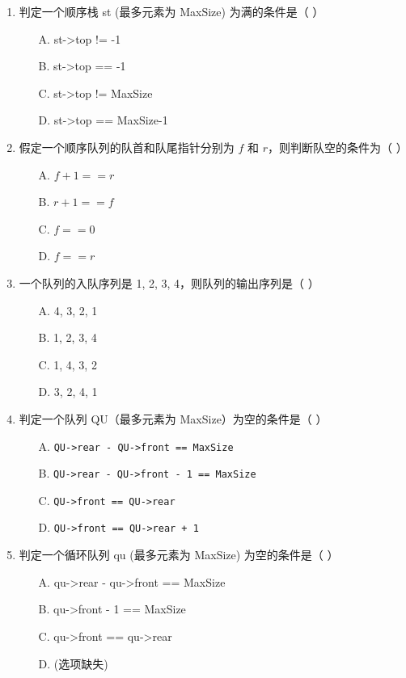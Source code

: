\documentclass[12pt, a4paper]{article}
\begin{document}
\begin{enumerate}[label=\arabic*.]
	\item 判定一个顺序栈 st (最多元素为 MaxSize) 为满的条件是（ ）
	      \begin{enumerate}
		      \item[A.] st->top != -1
		      \item[B.] st->top == -1
		      \item[C.] st->top != MaxSize
		      \item[D.] st->top == MaxSize-1
	      \end{enumerate}

	\item 假定一个顺序队列的队首和队尾指针分别为 $f$ 和 $r$，则判断队空的条件为（ ）
	      \begin{enumerate}
		      \item[A.] $f+1==r$
		      \item[B.] $r+1==f$
		      \item[C.] $f==0$
		      \item[D.] $f==r$
	      \end{enumerate}

	\item 一个队列的入队序列是 1, 2, 3, 4，则队列的输出序列是（ ）
	      \begin{enumerate}
		      \item[A.] 4, 3, 2, 1
		      \item[B.] 1, 2, 3, 4
		      \item[C.] 1, 4, 3, 2
		      \item[D.] 3, 2, 4, 1
	      \end{enumerate}

	\item 判定一个队列 QU（最多元素为 MaxSize）为空的条件是（ ）
	      \begin{enumerate}
		      \item[A.] \texttt{QU->rear - QU->front == MaxSize}
		      \item[B.] \texttt{QU->rear - QU->front - 1 == MaxSize}
		      \item[C.] \texttt{QU->front == QU->rear}
		      \item[D.] \texttt{QU->front == QU->rear + 1}
	      \end{enumerate}

	\item 判定一个循环队列 qu (最多元素为 MaxSize) 为空的条件是（ ）
	      \begin{enumerate}
		      \item[A.] qu->rear - qu->front == MaxSize
		      \item[B.] qu->front - 1 == MaxSize
		      \item[C.] qu->front == qu->rear
		      \item[D.] (选项缺失)
	      \end{enumerate}


\end{enumerate}
\end{document}
